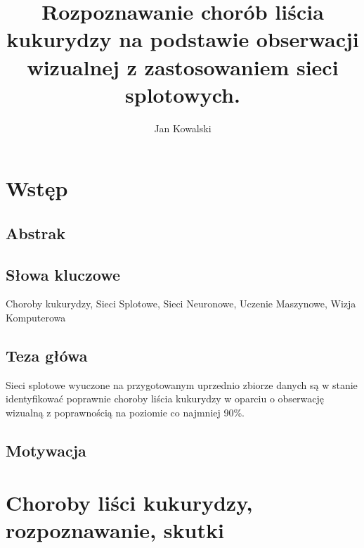\documentclass{article}
\title{Rozpoznawanie chorób liścia kukurydzy na podstawie obserwacji wizualnej z zastosowaniem 
sieci splotowych.}
\author{Jan Kowalski}
\begin{document}
\maketitle
\tableofcontents

\section{Wstęp}

\subsection{Abstrak}

\subsection{Słowa kluczowe}
Choroby kukurydzy, Sieci Splotowe, Sieci Neuronowe, Uczenie Maszynowe, Wizja Komputerowa

\subsection{Teza główa}
Sieci splotowe wyuczone na przygotowanym uprzednio zbiorze danych są w stanie identyfikować
poprawnie choroby liścia kukurydzy w oparciu o obserwację wizualną z poprawnością na poziomie
co najmniej 90\%.

\subsection{Motywacja}


\section{Choroby liści kukurydzy, rozpoznawanie, skutki}


\end{document}

